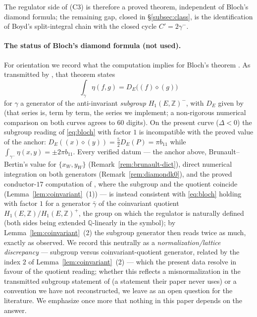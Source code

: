 \documentclass[preprint,12pt]{elsarticle}
\theoremstyle{definition}
\theoremstyle{remark}
\newcommand{\Q}{\mathbb{Q}}
\newcommand{\Z}{\mathbb{Z}}
\begin{document}
The regulator side of (C3) is therefore a proved theorem, independent of
Bloch's diamond formula; the remaining gap, closed in \S\ref{subsec:class},
is the identification of Boyd's split-integral chain with the closed cycle
$C'=2\gamma^-$.

\paragraph{The status of Bloch's diamond formula (not used).}
For orientation we record what the computation implies for Bloch's theorem
\cite{Bloch}.
As transmitted by \cite[Thm.~6]{LalinRam}, that theorem states
\begin{equation}\label{eq:bloch}
  \int_{\gamma}\eta(f,g)
  =D_E\big((f)\diamond(g)\big)
\end{equation}
for $\gamma$ a generator of the anti-invariant \emph{subgroup}
$H_1(E,\Z)^-$, with $D_E$ given by \cite[Def.~5, eq.~(10)]{LalinRam} (that
series is, term by term, the series we implement; a non-rigorous numerical
comparison on both curves agrees to $60$ digits).  On the present curve
($\Delta<0$) the subgroup reading of \eqref{eq:bloch} with factor $1$ is
incompatible with the proved value of the anchor:
$D_E((x)\diamond(y))=\frac52D_E(P)=\pi b_{11}$ while
$\int_{\gamma^-}\eta(x,y)=\pm2\pi b_{11}$.  Every verified datum --- the
anchor above, Brunault--Bertin's value for $\{x_W,y_W\}$
(Remark~\ref{rem:brunault-dict}), direct numerical integration on both
generators (Remark~\ref{rem:diamondk0}), and the proved conductor-$17$
computation of \cite{LalinRam}, where the subgroup and the quotient
coincide (Lemma~\ref{lem:coinvariant}~(1)) --- is instead consistent with
\eqref{eq:bloch} holding with factor $1$ for a generator $\bar\gamma$ of
the coinvariant quotient $H_1(E,\Z)/H_1(E,\Z)^+$, the group on which the
regulator is naturally defined (both sides being extended $\Q$-linearly in
the symbol); by Lemma~\ref{lem:coinvariant}~(2) the subgroup generator then
reads twice as much, exactly as observed.  We record this neutrally as a
\emph{normalization/lattice discrepancy} --- subgroup versus
coinvariant-quotient generator, related by the index $2$ of
Lemma~\ref{lem:coinvariant}~(2) --- which the present data resolve in
favour of the quotient reading; whether this reflects a misnormalization
in the transmitted subgroup statement of \cite[Thm.~6]{LalinRam} (a
statement their paper never uses) or a convention we have not
reconstructed, we leave as an open question for the literature.  We
emphasize once more that nothing in this paper depends on the answer.
\end{document}
